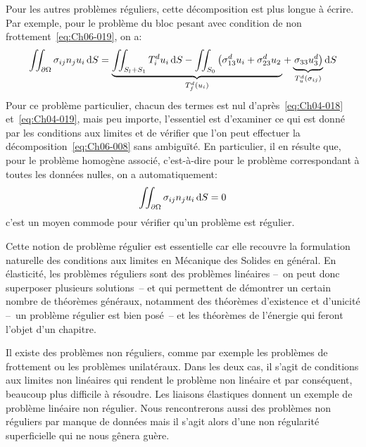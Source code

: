 Pour les autres problèmes réguliers, cette décomposition est plus longue à écrire.
Par exemple, pour le problème du bloc pesant avec condition de non frottement~\eqref{eq:Ch06-019}, on a:
\begin{equation}
    \iint_{\partial \Omega} \sigma_{ij} n_j u_i \mathop{\mathrm{{}d}}\mathopen{} S = \underbrace{\iint_{S_l +S_1} T_i^d u_i \mathop{\mathrm{{}d}}\mathopen{} S - \iint_{S_0} \left( \sigma_{13}^d u_i + \sigma_{23}^d u_2 \right.}_{T_f^d\left( u_i \right)} + \underbrace{ \left.\sigma_{33} u_3^d \right)}_{T_u^d\left(\sigma_{ij} \right)} \mathop{\mathrm{{}d}}\mathopen{} S
    \label{eq:Ch06-010}
\end{equation}
Pour ce problème particulier, chacun des termes est nul d'après~\eqref{eq:Ch04-018} et~\eqref{eq:Ch04-019}, mais peu importe, l'essentiel est d'examiner ce qui est donné par les conditions aux limites et de vérifier que l'on peut effectuer la décomposition~\eqref{eq:Ch06-008} sans ambiguïté.
En particulier, il en résulte que, pour le problème homogène associé, c'est-à-dire pour le problème correspondant à toutes les données nulles, on a automatiquement:
\begin{equation}
    \iint_{\partial \Omega} \sigma_{ij} n_j u_i \mathop{\mathrm{{}d}}\mathopen{} S = 0
    \label{eq:Ch06-011}
\end{equation}
c'est un moyen commode pour vérifier qu'un problème est régulier.

Cette notion de problème régulier est essentielle car elle recouvre la formulation naturelle des conditions aux limites en Mécanique des Solides en général.
En élasticité, les problèmes réguliers sont des problèmes linéaires --~on peut donc superposer plusieurs solutions~-- et qui permettent de démontrer un certain nombre de théorèmes généraux, notamment des théorèmes d'existence et d'unicité --~un problème régulier est bien posé~-- et les théorèmes de l'énergie qui feront l'objet d'un chapitre.

Il existe des problèmes non réguliers, comme par exemple les problèmes de frottement ou les problèmes unilatéraux.
Dans les deux cas, il s'agit de conditions aux limites non linéaires qui rendent le problème non linéaire et par conséquent, beaucoup plus difficile à résoudre.
Les liaisons élastiques donnent un exemple de problème linéaire non régulier.
Nous rencontrerons aussi des problèmes non réguliers par manque de données mais il s'agit alors d'une non régularité superficielle qui ne nous gênera guère.


